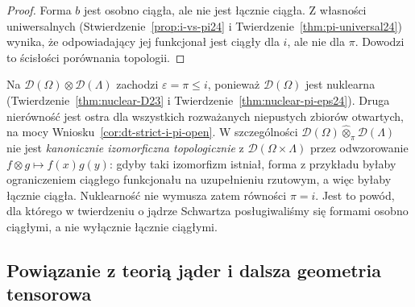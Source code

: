\begin{proof}
Forma $b$ jest osobno ciągła, ale nie jest łącznie
ciągła. Z własności uniwersalnych
(Stwierdzenie~\ref{prop:i-vs-pi24} i
Twierdzenie~\ref{thm:pi-universal24})
wynika, że odpowiadający jej funkcjonał jest
ciągły dla $i$, ale nie dla $\pi$. Dowodzi to
ścisłości porównania topologii.
\end{proof}

\begin{uwaga}
\label{rem:D-not-projective24}
Na $\mathcal D(\Omega)\otimes\mathcal D(\Lambda)$
zachodzi $\varepsilon=\pi\le i$, ponieważ
$\mathcal D(\Omega)$ jest nuklearna
(Twierdzenie~\ref{thm:nuclear-D23} i
Twierdzenie~\ref{thm:nuclear-pi-eps24}).
Druga nierówność jest ostra dla wszystkich rozważanych
niepustych zbiorów otwartych, na mocy
Wniosku~\ref{cor:dt-strict-i-pi-open}.
W szczególności
$\mathcal D(\Omega)\widehat\otimes_\pi\mathcal D(\Lambda)$
nie jest \emph{kanonicznie izomorficzna topologicznie}
z $\mathcal D(\Omega\times\Lambda)$ przez odwzorowanie
$f\otimes g\mapsto f(x)g(y)$: gdyby taki izomorfizm
istniał, forma z przykładu byłaby ograniczeniem
ciągłego funkcjonału na uzupełnieniu rzutowym,
a więc byłaby łącznie ciągła. Nuklearność nie wymusza
zatem równości $\pi=i$. Jest to powód, dla którego
w twierdzeniu o jądrze Schwartza posługiwaliśmy się
formami osobno ciągłymi, a nie wyłącznie łącznie ciągłymi.
\end{uwaga}

\subsection{Powiązanie z teorią jąder i dalsza geometria tensorowa}

